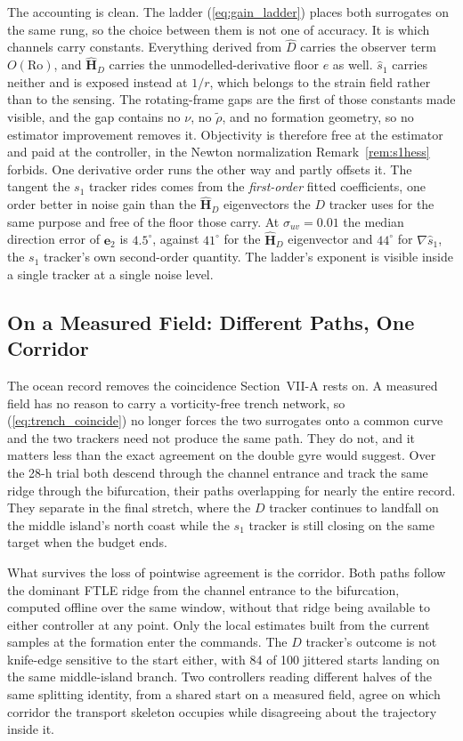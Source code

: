 \documentclass[lettersize,journal]{IEEEtran}
\begin{document}
The accounting is clean. The ladder (\ref{eq:gain_ladder}) places both
surrogates on the same rung, so the choice between them is not one of
accuracy. It is which channels carry constants. Everything derived from
$\hat{D}$ carries the observer term $O(\mathrm{Ro})$, and
$\hat{\mathbf{H}}_D$ carries the unmodelled-derivative floor $e$ as
well. $\hat{s}_1$ carries neither and is exposed instead at $1/r$,
which belongs to the strain field rather than to the sensing. The
rotating-frame gaps are the first of those constants made visible, and
the gap contains no $\nu$, no $\tilde{\rho}$, and no formation
geometry, so no estimator improvement removes it. Objectivity is
therefore free at the estimator and paid at the controller, in the
Newton normalization Remark~\ref{rem:s1hess} forbids. One derivative
order runs the other way and partly offsets it. The tangent the $s_1$
tracker rides comes from the \emph{first-order} fitted coefficients,
one order better in noise gain than the $\hat{\mathbf{H}}_D$
eigenvectors the $D$ tracker uses for the same purpose and free of the
floor those carry. At $\sigma_{uv} = 0.01$ the median direction error
of $\mathbf{e}_2$ is $4.5^\circ$, against $41^\circ$ for the
$\hat{\mathbf{H}}_D$ eigenvector and $44^\circ$ for $\nabla\hat{s}_1$,
the $s_1$ tracker's own second-order quantity. The ladder's exponent is
visible inside a single tracker at a single noise level.

\subsection{On a Measured Field: Different Paths, One Corridor}
\label{sec:disc_ocean}

The ocean record removes the coincidence Section~\mbox{VII-A} rests on.
A measured field has no reason to carry a vorticity-free trench
network, so (\ref{eq:trench_coincide}) no longer forces the two
surrogates onto a common curve and the two trackers need not produce
the same path. They do not, and it matters less than the exact
agreement on the double gyre would suggest. Over the 28-h trial both descend through the
channel entrance and track the same ridge through the bifurcation,
their paths overlapping for nearly the entire record. They separate in
the final stretch, where the $D$ tracker continues to landfall on the
middle island's north coast while the $s_1$ tracker is still closing on
the same target when the budget ends.

What survives the loss of pointwise agreement is the corridor. Both
paths follow the dominant FTLE ridge from the channel entrance to the
bifurcation, computed offline over the same window, without that ridge
being available to either controller at any point. Only the local
estimates built from the current samples at the formation enter the
commands. The $D$ tracker's outcome is not knife-edge sensitive to the
start either, with 84 of 100 jittered starts landing on the same
middle-island branch. Two controllers reading different halves of the
same splitting identity, from a shared start on a measured field, agree
on which corridor the transport skeleton occupies while disagreeing
about the trajectory inside it.
\end{document}
